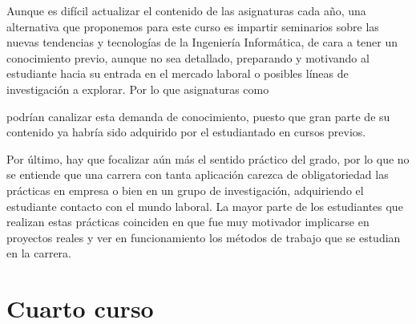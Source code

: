 Aunque es difícil actualizar el contenido de las asignaturas cada año,
una alternativa que proponemos para este curso es
impartir seminarios sobre las nuevas tendencias y tecnologías
de la Ingeniería Informática,
de cara a tener un conocimiento previo, aunque no sea detallado,
preparando y motivando al estudiante hacia su entrada en el mercado laboral o
posibles líneas de investigación a explorar.
Por lo que asignaturas como
\subject{Tecnologías Específicas de la Ingeniería Informática (TEII)}
podrían canalizar esta demanda de conocimiento,
puesto que gran parte de su contenido ya habría sido adquirido
por el estudiantado en cursos previos.

Por último, hay que focalizar aún más el sentido práctico del grado,
por lo que no se entiende que una carrera con tanta aplicación
carezca de obligatoriedad las prácticas en empresa
o bien en un grupo de investigación,
adquiriendo el estudiante contacto con el mundo laboral.
La mayor parte de los estudiantes que realizan estas prácticas coinciden en que
fue muy motivador implicarse en proyectos reales y
ver en funcionamiento los métodos de trabajo que se estudian en la carrera.

\section{Cuarto curso}

